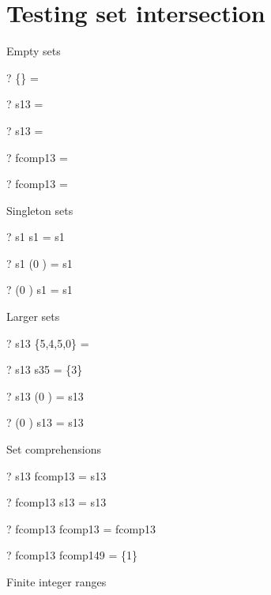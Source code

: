 \documentclass{article}
\begin{document}
\section{Testing set intersection}
Empty sets
\begin{zed} \vdash?  \{\}      \cap \emptyset   = \emptyset \end{zed}
\begin{zed} \vdash?  \emptyset \cap s13         = \emptyset \end{zed}
\begin{zed} \vdash?  s13       \cap \emptyset   = \emptyset \end{zed}
\begin{zed} \vdash?  \emptyset \cap fcomp13     = \emptyset \end{zed}
\begin{zed} \vdash?  fcomp13   \cap \emptyset   = \emptyset \end{zed}
Singleton sets
\begin{zed} \vdash?  s1        \cap s1          = s1 \end{zed}
\begin{zed} \vdash?  s1        \cap (0 ) = s1 \end{zed}
\begin{zed} \vdash?  (0 ) \cap s1        = s1 \end{zed}
Larger sets
\begin{zed} \vdash?  s13       \cap \{5,4,5,0\} = \emptyset \end{zed}
\begin{zed} \vdash?  s13       \cap s35         = \{3\} \end{zed}
\begin{zed} \vdash?  s13       \cap (0 ) = s13 \end{zed}
\begin{zed} \vdash?  (0 ) \cap s13       = s13 \end{zed}
Set comprehensions
\begin{zed} \vdash?  s13       \cap fcomp13     = s13 \end{zed}
\begin{zed} \vdash?  fcomp13   \cap s13         = s13 \end{zed}
\begin{zed} \vdash?  fcomp13   \cap fcomp13     = fcomp13 \end{zed}
\begin{zed} \vdash?  fcomp13   \cap fcomp149    = \{1\} \end{zed}
Finite integer ranges
\end{document}
